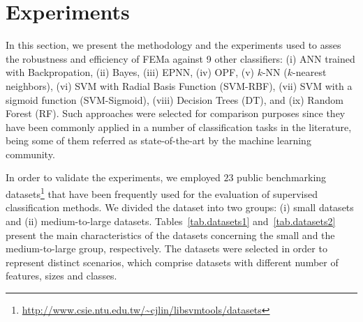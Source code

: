 \section{Experiments}
\label{s.methodology}

In this section, we present the methodology and the experiments used to asses the robustness and efficiency of FEMa against 9 other classifiers: (i) ANN trained with Backpropation, (ii) Bayes, (iii) EPNN, (iv) OPF, (v) $k$-NN ($k$-nearest neighbors), (vi) SVM with Radial Basis Function (SVM-RBF), (vii) SVM with a sigmoid function (SVM-Sigmoid), (viii) Decision Trees (DT), and (ix) Random Forest (RF). Such approaches were selected for comparison purposes since they have been commonly applied in a number of classification tasks in the literature, being some of them referred as state-of-the-art by the machine learning community.

In order to validate the experiments, we employed $23$ public benchmarking datasets\footnote{\url{http://www.csie.ntu.edu.tw/~cjlin/libsvmtools/datasets}} that have been frequently used for the evaluation of supervised classification methods. We divided the dataset into two groups: (i) small datasets and (ii) medium-to-large datasets. Tables~\ref{tab.datasets1} and~\ref{tab.datasets2} present the main characteristics of the datasets concerning the small and the medium-to-large group, respectively. The datasets were selected in order to represent distinct scenarios, which comprise datasets with different number of features, sizes and classes. 

